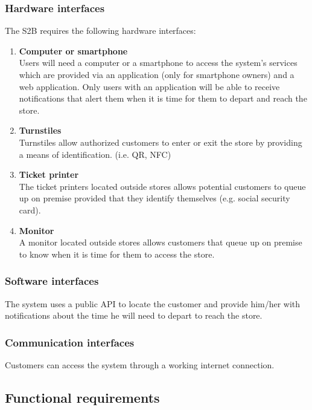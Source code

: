 \subsubsection{Hardware interfaces}
The S2B requires the following hardware interfaces:
\begin{enumerate}
	\item {\bfseries Computer or smartphone}\\
	Users will need a computer or a smartphone to access the system's services which are provided via an application (only for smartphone owners) and a web application. Only users with an application will be able to receive notifications that alert them when it is time for them to depart and reach the store.
	\item {\bfseries Turnstiles}\\
	Turnstiles allow authorized customers to enter or exit the store by providing a means of identification. (i.e. QR, NFC)
	\item {\bfseries Ticket printer}\\
	The ticket printers located outside stores allows potential customers to queue up on premise provided that they identify themselves (e.g. social security card).
	\item \textbf{Monitor}\\
	A monitor located outside stores allows customers that queue up on premise to know when it is time for them to access the store.
\end{enumerate}

\subsubsection{Software interfaces}
The system uses a public API to locate the customer and provide him/her with notifications about the time he will need to depart to reach the store.

\subsubsection{Communication interfaces}
Customers can access the system through a working internet connection.

\subsection{Functional requirements}
